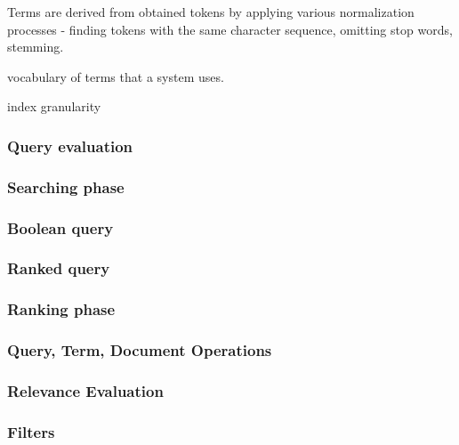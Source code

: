 Terms are derived from obtained tokens by applying various normalization processes - finding tokens with the same character sequence, omitting stop words, stemming. 

vocabulary of terms that a system uses.

index granularity
	
\subsubsection{Query evaluation}

\subsubsection{Searching phase}


\subsubsection*{Boolean query}

\subsubsection*{Ranked query}


\subsubsection{Ranking phase}	


\subsubsection*{Query, Term, Document Operations}

\subsubsection*{Relevance Evaluation}

\subsubsection*{Filters}




